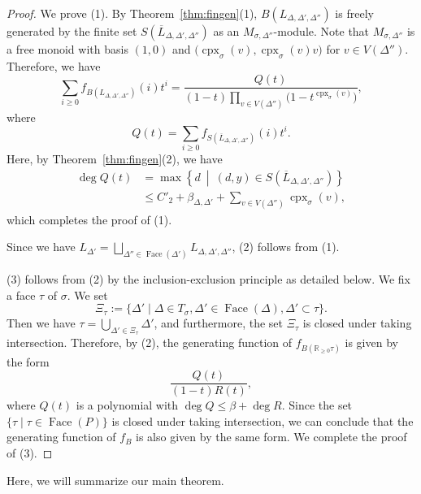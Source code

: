 \begin{proof}
We prove (1). 
By Theorem~\ref{thm:fingen}(1), $B \left( L_{\Delta, \Delta ', \Delta''} \right)$ is freely generated by 
the finite set $S \left(\overline{L}_{\Delta, \Delta ', \Delta''} \right)$ as an $M_{\sigma, \Delta ''}$-module. 
Note that $M_{\sigma, \Delta ''}$ is a free monoid with basis $(1,0)$ and 
$\bigl( \operatorname{cpx}_{\sigma}(v), \operatorname{cpx}_{\sigma}(v)v \bigr)$ for 
$v \in V(\Delta '')$. 
Therefore, we have 
\[
\sum _{i \ge 0} f_{B ( L_{\Delta, \Delta ', \Delta''} )}(i) t^i = 
\frac{Q(t)}{(1-t) \prod _{v \in V(\Delta '')} \bigl( 1 - t^{\operatorname{cpx}_{\sigma}(v)} \bigr)}, 
\]
where 
\[
Q(t) = \sum _{i \ge 0} f_{S ( \overline{L}_{\Delta, \Delta ', \Delta''} )}(i) t^i. 
\]
Here, by Theorem~\ref{thm:fingen}(2), we have  
\begin{align*}
\deg Q(t) 
&= \max \left \{ d \ \middle | \ (d,y) \in S \left(\overline{L}_{\Delta, \Delta ', \Delta''} \right) \right \} \\
&\le C'_2 + \beta _{\Delta, \Delta '} + \sum _{v \in V(\Delta '')} \operatorname{cpx}_{\sigma}(v), 
\end{align*}
which completes the proof of (1). 

Since we have 
$L_{\Delta '} = \bigsqcup _{\Delta '' \in \operatorname{Face}(\Delta ')} L_{\Delta, \Delta ', \Delta''}$, (2) follows from (1). 

(3) follows from (2) by the inclusion-exclusion principle as detailed below.  
We fix a face $\tau$ of $\sigma$. We set
\[
\Xi _{\tau} := \{ \Delta ' \mid \Delta \in T_{\sigma}, \Delta ' \in \operatorname{Face}(\Delta), \Delta ' \subset \tau \}. 
\]
Then we have $\tau = \bigcup _{\Delta ' \in \Xi _{\tau}} \Delta '$, 
and furthermore, the set $\Xi _{\tau}$ is closed under taking intersection. 
Therefore, by (2), the generating function of $f_{B(\mathbb{R}_{\ge 0} \tau)}$ is given by the form
\[
\frac{Q(t)}{(1-t)R(t)}, 
\]
where $Q(t)$ is a polynomial with $\deg Q \le \beta + \deg R$. 
Since the set $\{ \tau \mid \tau \in \operatorname{Face}(P) \}$ is closed under taking intersection, 
we can conclude that the generating function of $f_B$ is also given by the same form. 
We complete the proof of (3). 
\end{proof}

Here, we will summarize our main theorem. 

